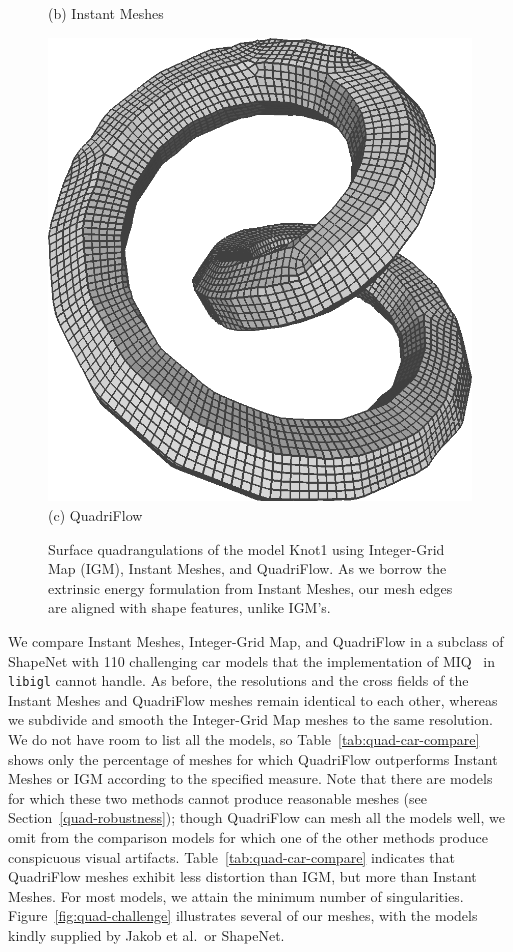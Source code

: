\begin{figure}
\begin{minipage}{0.25\linewidth}
(b) Instant Meshes
\end{minipage}
\begin{minipage}{0.25\linewidth}
\centering
\includegraphics[width=\linewidth]{quadriflow/result/feature03.png}\\
(c) QuadriFlow
\end{minipage}

\caption{Surface quadrangulations of the model Knot1 using Integer-Grid Map (IGM), Instant Meshes, and QuadriFlow. As we borrow the extrinsic energy formulation from Instant Meshes, our mesh edges are aligned with shape features, unlike IGM's.}
\label{fig:quad-shape-feature}
\end{figure}

We compare Instant Meshes, Integer-Grid Map, and QuadriFlow in a subclass of ShapeNet with 110 challenging car models that the implementation of MIQ~\cite{bommes2009mixed} in \texttt{libigl} cannot handle. As before, the resolutions and the cross fields of the Instant Meshes and QuadriFlow meshes remain identical to each other, whereas we subdivide and smooth the Integer-Grid Map meshes to the same resolution. We do not have room to list all the models, so Table~\ref{tab:quad-car-compare} shows only the percentage of meshes for which QuadriFlow outperforms Instant Meshes or IGM according to the specified measure. Note that there are models for which these two methods cannot produce reasonable meshes (see Section~\ref{quad-robustness}); though QuadriFlow can mesh all the models well, we omit from the comparison models for which one of the other methods produce conspicuous visual artifacts. Table~\ref{tab:quad-car-compare} indicates that QuadriFlow meshes exhibit less distortion than IGM, but more than Instant Meshes. For most models, we attain the minimum number of singularities. Figure~\ref{fig:quad-challenge} illustrates several of our meshes, with the models kindly supplied by Jakob et al.\ or ShapeNet.

